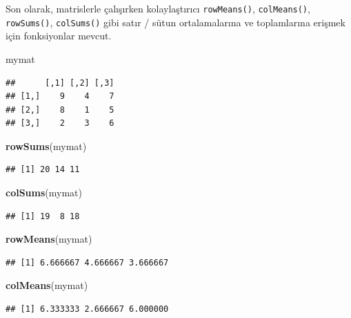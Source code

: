 \documentclass[]{book}
\newenvironment{Shaded}{\begin{snugshade}}{\end{snugshade}}
\newcommand{\KeywordTok}[1]{\textcolor[rgb]{0.13,0.29,0.53}{\textbf{#1}}}
\newcommand{\NormalTok}[1]{#1}
\begin{document}
Son olarak, matrislerle çalışırken kolaylaştırıcı \texttt{rowMeans()},
\texttt{colMeans()}, \texttt{rowSums()}, \texttt{colSums()} gibi satır /
sütun ortalamalarına ve toplamlarına erişmek için fonksiyonlar mevcut.

\begin{Shaded}
\begin{Highlighting}[]
\NormalTok{mymat}
\end{Highlighting}
\end{Shaded}

\begin{verbatim}
##      [,1] [,2] [,3]
## [1,]    9    4    7
## [2,]    8    1    5
## [3,]    2    3    6
\end{verbatim}

\begin{Shaded}
\begin{Highlighting}[]
\KeywordTok{rowSums}\NormalTok{(mymat)}
\end{Highlighting}
\end{Shaded}

\begin{verbatim}
## [1] 20 14 11
\end{verbatim}

\begin{Shaded}
\begin{Highlighting}[]
\KeywordTok{colSums}\NormalTok{(mymat)}
\end{Highlighting}
\end{Shaded}

\begin{verbatim}
## [1] 19  8 18
\end{verbatim}

\begin{Shaded}
\begin{Highlighting}[]
\KeywordTok{rowMeans}\NormalTok{(mymat)}
\end{Highlighting}
\end{Shaded}

\begin{verbatim}
## [1] 6.666667 4.666667 3.666667
\end{verbatim}

\begin{Shaded}
\begin{Highlighting}[]
\KeywordTok{colMeans}\NormalTok{(mymat)}
\end{Highlighting}
\end{Shaded}

\begin{verbatim}
## [1] 6.333333 2.666667 6.000000
\end{verbatim}


\end{document}
